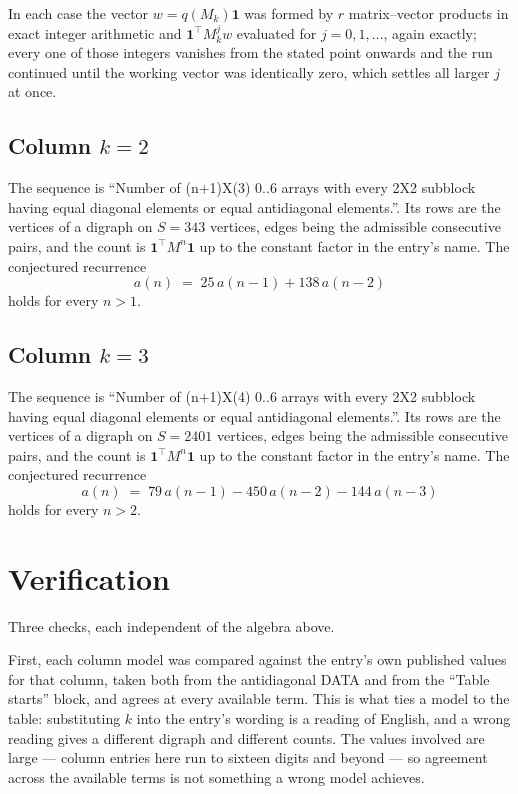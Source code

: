 \documentclass[11pt,a4paper]{article}
\theoremstyle{plain}
\theoremstyle{definition}
\begin{document}
In each case the vector $w=q(M_k)\mathbf{1}$ was formed by $r$ matrix--vector products in
exact integer arithmetic and $\mathbf{1}^{\!\top}M_k^{j}w$ evaluated for $j=0,1,\dots$,
again exactly; every one of those integers vanishes from the stated point onwards and the run
continued until the working vector was identically zero, which settles all larger $j$ at once.

\subsection*{Column $k=2$}
The sequence is ``Number of (n+1)X(3) 0..6 arrays with every 2X2 subblock having equal diagonal elements or equal antidiagonal elements.''. Its rows are the vertices of a digraph on
$S=343$ vertices, edges being the admissible consecutive pairs, and the count is
$\mathbf{1}^{\!\top}M^{n}\mathbf{1}$ up to the constant factor in the entry's name.
The conjectured recurrence
\[
a(n)\;=\;25\,a(n-1) + 138\,a(n-2)
\]
holds for every $n>1$.

\subsection*{Column $k=3$}
The sequence is ``Number of (n+1)X(4) 0..6 arrays with every 2X2 subblock having equal diagonal elements or equal antidiagonal elements.''. Its rows are the vertices of a digraph on
$S=2401$ vertices, edges being the admissible consecutive pairs, and the count is
$\mathbf{1}^{\!\top}M^{n}\mathbf{1}$ up to the constant factor in the entry's name.
The conjectured recurrence
\[
a(n)\;=\;79\,a(n-1) - 450\,a(n-2) - 144\,a(n-3)
\]
holds for every $n>2$.

\section{Verification}

Three checks, each independent of the algebra above.

First, each column model was compared against the entry's own published values for that
column, taken both from the antidiagonal DATA and from the ``Table starts'' block, and agrees
at every available term. This is what ties a model to the table: substituting $k$ into the
entry's wording is a reading of English, and a wrong reading gives a different digraph and
different counts. The values involved are large --- column entries here run to sixteen digits
and beyond --- so agreement across the available terms is not something a wrong model
achieves.
\end{document}
